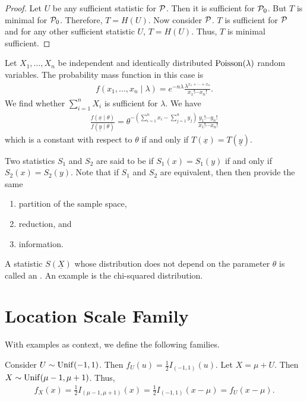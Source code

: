 \begin{proof}
    Let $U$ be any sufficient statistic for $\mathcal{P}$. Then it is sufficient for $\mathcal{P}_{0}$. But $T$ is minimal for $\mathcal{P}_{0}$. Therefore, $T = H(U)$. Now consider $\mathcal{P}$. $T$ is sufficient for $\mathcal{P}$ and for any other sufficient statistic $U$, $T = H(U)$. Thus, $T$ is minimal sufficient.
\end{proof}

\begin{example}
    Let $X_{1},\ldots,X_{n}$ be independent and identically distributed $\operatorname{Poisson}(\lambda)$ random variables. The probability mass function in this case is
    \begin{align}
        f(x_{1},\ldots,x_{n}\mid \lambda) = e^{-n\lambda} \frac{\lambda^{x_{1}+\cdots+x_{n}}}{x_{1}!\cdots x_{n}!}.
    \end{align}
    We find whether $\sum_{i=1}^{n} X_{i}$ is sufficient for $\lambda$. We have
    \begin{align}
        \frac{f(\underline{x} \mid \theta)}{f(\underline{y} \mid \theta)} = \theta^{-\left(\sum_{i=1}^{n} x_{i} - \sum_{j=1}^{n} y_{j}\right)} \frac{y_{1}! \cdots y_{n}!}{x_{1}! \cdots x_{n}!}
    \end{align}
    which is a constant with respect to $\theta$ if and only if $T(\underline{x}) = T(\underline{y})$.
\end{example}

\begin{definition}
    Two statistics $S_{1}$ and $S_{2}$ are said to be  if $S_{1}(x) = S_{1}(y)$ if and only if $S_{2}(x) = S_{2}(y)$. Note that if $S_{1}$ and $S_{2}$ are equivalent, then then provide the same
    \begin{enumerate}
        \item partition of the sample space,
        \item reduction, and
        \item information.
    \end{enumerate}
\end{definition}

\begin{definition}
    A statistic $S(\underline{X})$ whose distribution does not depend on the parameter $\theta$ is called an . An example is the chi-squared distribution. 
\end{definition}

\section{Location Scale Family}
With examples as context, we define the following families.
\begin{example}
    Consider $U \sim \operatorname{Unif}(-1,1)$. Then $f_{U}(u) = \frac{1}{2} I_{(-1,1)}(u)$. Let $X = \mu + U$. Then $X \sim \operatorname{Unif}(\mu-1,\mu+1)$. Thus,
\begin{align}
    f_{X}(x) = \frac{1}{2}I_{(\mu-1,\mu+1)}(x) = \frac{1}{2}I_{(-1,1)}(x-\mu) = f_{U}(x-\mu).
\end{align}
\end{example}

